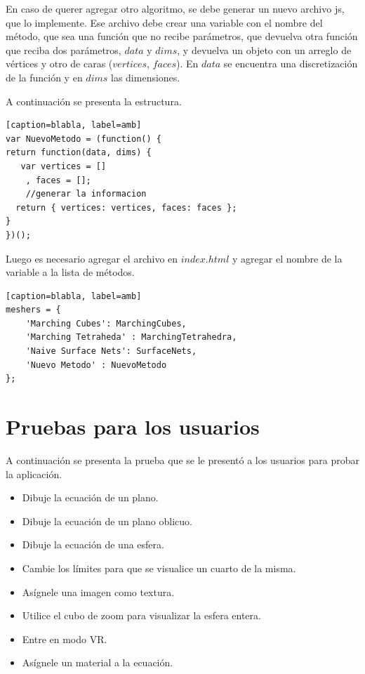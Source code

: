 \documentclass[12pt]{article}
\begin{document}
En caso de querer agregar otro algoritmo, se debe generar un nuevo archivo js, que lo implemente. Ese archivo debe crear una variable con el nombre del método, que sea una función que no recibe parámetros, que devuelva otra función que reciba dos parámetros, $data$ y $dims$, y devuelva un objeto con un arreglo de vértices y otro de caras ($vertices$, $faces$). En $data$ se encuentra una discretización de la función y en $dims$ las dimensiones.

A continuación se presenta la estructura.
\begin{lstlisting}[frame=single][caption=blabla, label=amb]
var NuevoMetodo = (function() {
return function(data, dims) {   
   var vertices = []
    , faces = [];
    //generar la informacion
  return { vertices: vertices, faces: faces };
}
})();
\end{lstlisting}

Luego es necesario agregar el archivo en $index.html$ y agregar el nombre de la variable a la lista de métodos.
\begin{lstlisting}[frame=single][caption=blabla, label=amb]
meshers = {
    'Marching Cubes': MarchingCubes,
    'Marching Tetraheda' : MarchingTetrahedra,
    'Naive Surface Nets': SurfaceNets,
    'Nuevo Metodo' : NuevoMetodo
};
\end{lstlisting}
\clearpage
\null\newpage
\section{Pruebas para los usuarios}
A continuación se presenta la prueba que se le presentó a los usuarios para probar la aplicación.
\begin{itemize}
\item Dibuje la ecuación de un plano.
\item Dibuje la ecuación de un plano oblicuo.
\item Dibuje la ecuación de una esfera.
\item Cambie los límites para que se visualice un cuarto de la misma.
\item Asígnele una imagen como textura.
\item Utilice el cubo de zoom para visualizar la esfera entera.
\item Entre en modo VR.
\item Asígnele un material a la ecuación.
\end{itemize}
\clearpage
\null\newpage
\end{document}
